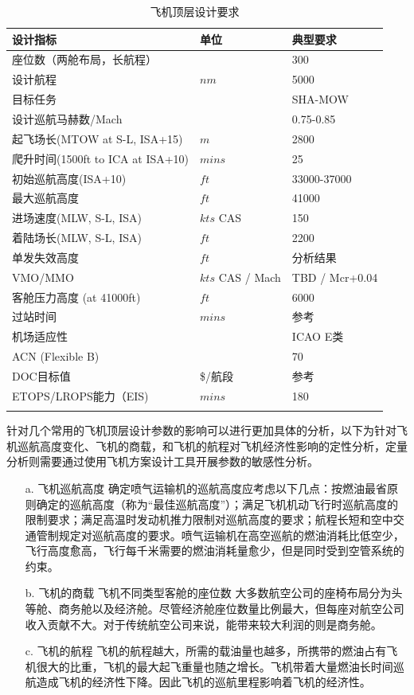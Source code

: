 \documentclass[12pt,a4paper]{report}
\begin{document}
\begin{table}[ht!]
\centering
\caption{飞机顶层设计要求}
\small
\begin{tabular}{|p{5.5cm}|p{2.5cm}|p{4cm}|}
\hhline{|===|}
设计指标 &单位 & 典型要求 \\ \hline
座位数（两舱布局，长航程）& & 300 \\ \hline
设计航程 & $nm$ &  5000\\ \hline 
目标任务 & & SHA-MOW  \\ \hline 
设计巡航马赫数/Mach &  &  0.75-0.85 \\ \hline 
起飞场长(MTOW at S-L, ISA+15)  & $m$ & 2800 \\ \hline 
爬升时间(1500ft to ICA at ISA+10)  & $mins$ &  25 \\ \hline 
初始巡航高度(ISA+10)   & $ft$ & 33000-37000  \\ \hline 
最大巡航高度 & $ft$ &  41000 \\ \hline 
进场速度(MLW, S-L, ISA)   & $kts$ CAS & 150 \\ \hline 
着陆场长(MLW, S-L, ISA)  & $ft$ &  2200 \\ \hline 
单发失效高度 &  $ft$ & 分析结果 \\ \hline 
VMO/MMO  & $kts$ CAS / Mach &  TBD / Mcr+0.04\\ \hline 
客舱压力高度 (at 41000ft)  & $ft$  &  6000 \\ \hline 
过站时间 & $mins$ & 参考 \\ \hline 
机场适应性 & &   ICAO E类 \\ \hline 
ACN (Flexible B)  & &  70 \\ \hline 
DOC目标值  & \$/航段  &  参考\\ \hline 
ETOPS/LROPS能力（EIS) &  $mins$ &  180 \\ \hline 
\hhline{|===|}
\end{tabular}
\label{tlar} 
\end{table}

针对几个常用的飞机顶层设计参数的影响可以进行更加具体的分析，以下为针对飞机巡航高度变化、飞机的商载，和飞机的航程对飞机经济性影响的定性分析，定量分析则需要通过使用飞机方案设计工具开展参数的敏感性分析。

\begin{enumerate}
\item[a.]飞机巡航高度
确定喷气运输机的巡航高度应考虑以下几点：按燃油最省原则确定的巡航高度（称为“最佳巡航高度”）；满足飞机机动飞行时巡航高度的限制要求；满足高温时发动机推力限制对巡航高度的要求；航程长短和空中交通管制规定对巡航高度的要求。喷气运输机在高空巡航的燃油消耗比低空少，飞行高度愈高，飞行每千米需要的燃油消耗量愈少，但是同时受到空管系统的约束。 

\item[b.]飞机的商载
飞机不同类型客舱的座位数
大多数航空公司的座椅布局分为头等舱、商务舱以及经济舱。尽管经济舱座位数量比例最大，但每座对航空公司收入贡献不大。对于传统航空公司来说，能带来较大利润的则是商务舱。

\item[c.]飞机的航程
飞机的航程越大，所需的载油量也越多，所携带的燃油占有飞机很大的比重，飞机的最大起飞重量也随之增长。飞机带着大量燃油长时间巡航造成飞机的经济性下降。因此飞机的巡航里程影响着飞机的经济性。
\end{enumerate}
\end{document}
